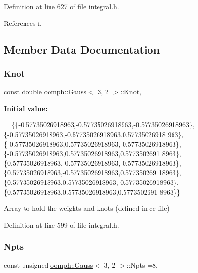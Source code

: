 Definition at line 627 of file integral.\+h.



References i.



\subsection{Member Data Documentation}
\mbox{\label{classoomph_1_1Gauss_3_013_00_012_01_4_a912e196dc719493e61224026a0bd274f}} 
\subsubsection{\texorpdfstring{Knot}{Knot}}
{\footnotesize\ttfamily const double \hyperlink{classoomph_1_1Gauss}{oomph\+::\+Gauss}$<$ 3, 2 $>$\+::Knot\hspace{0.3cm}{\ttfamily [static]}, {\ttfamily [private]}}

{\bfseries Initial value\+:}
\begin{DoxyCode}
=
\{\{-0.57735026918963,-0.57735026918963,-0.57735026918963\},\{-0.57735026918963,-0.57735026918963,0.57735026918
      963\},\{-0.57735026918963,0.57735026918963,-0.57735026918963\},\{-0.57735026918963,0.57735026918963,0.5773502691
      8963\},\{0.57735026918963,-0.57735026918963,-0.57735026918963\},\{0.57735026918963,-0.57735026918963,0.577350269
      18963\},\{0.57735026918963,0.57735026918963,-0.57735026918963\},\{0.57735026918963,0.57735026918963,0.5773502691
      8963\}\}
\end{DoxyCode}


Array to hold the weights and knots (defined in cc file) 



Definition at line 599 of file integral.\+h.

\mbox{\label{classoomph_1_1Gauss_3_013_00_012_01_4_afd00a1b937d71d1eb35a6ab66fff12eb}} 
\subsubsection{\texorpdfstring{Npts}{Npts}}
{\footnotesize\ttfamily const unsigned \hyperlink{classoomph_1_1Gauss}{oomph\+::\+Gauss}$<$ 3, 2 $>$\+::Npts =8\hspace{0.3cm}{\ttfamily [static]}, {\ttfamily [private]}}



